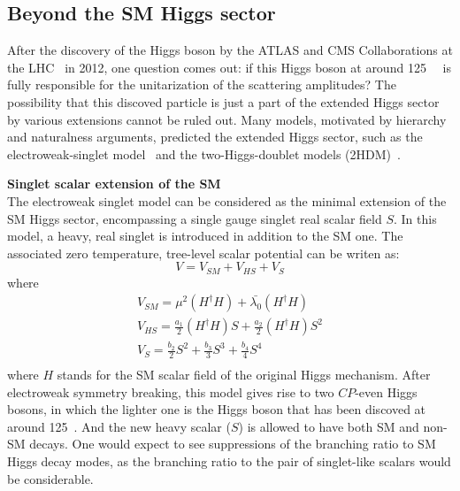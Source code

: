 \subsection{Beyond the SM Higgs sector}
\label{bsmhiggs}

After the discovery of the Higgs boson by the ATLAS and CMS Collaborations at the LHC~\cite{20121, 201230} in 2012,
one question comes out: if this Higgs boson at around 125~\gev~ is fully responsible for the unitarization of the scattering amplitudes?
The possibility that this discoved particle is just a part of the extended Higgs sector by various extensions cannot be ruled out.
Many models, motivated by hierarchy and naturalness arguments, 
predicted the extended Higgs sector, such as the electroweak-singlet model~\cite{Profumo_2007} and the two-Higgs-doublet models (2HDM)~\cite{BRANCO20121}.

\textbf{Singlet scalar extension of the SM} \\
The electroweak singlet model can be considered as the minimal extension of the SM Higgs sector, encompassing a single gauge singlet real scalar field $S$.
In this model, a heavy, real singlet is introduced in addition to the SM one.
The associated zero temperature, tree-level scalar potential can be writen as:
\begin{equation}
    V = V_{SM} + V_{HS} + V_{S}
\end{equation}
where
\begin{equation}
\begin{split}
    V_{SM} =  \mu^{2} \left( H^{\dagger}H \right) + \bar{\lambda_{0}} \left( H^{\dagger}H \right) \\
    V_{HS} = \frac{a_{1}}{2}\left( H^{\dagger}H \right)S + \frac{a_{2}}{2}\left( H^{\dagger}H \right)S^{2} \\
    V_{S} = \frac{b_{2}}{2} S^{2} + \frac{b_{3}}{3} S^{3} + \frac{b_{4}}{4} S^{4} \\ 
\end{split}
\end{equation}
where $H$ stands for the SM scalar field of the original Higgs mechanism.
After electroweak symmetry breaking, this model gives rise to two $CP$-even Higgs bosons, in which the lighter one is the Higgs boson that has been discoved at around 125~\gev.
And the new heavy scalar ($S$) is allowed to have both SM and non-SM decays.
One would expect to see suppressions of the branching ratio to SM Higgs decay modes, as the branching ratio to the pair of singlet-like scalars would be considerable. 


